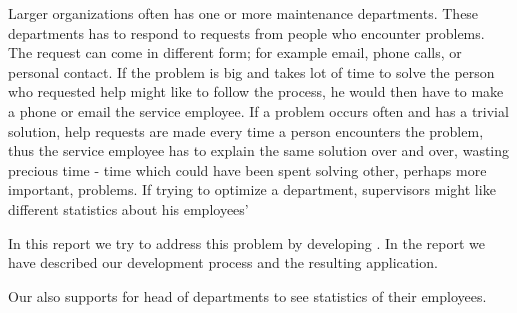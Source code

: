 Larger organizations often has one or more maintenance departments.
These departments has to respond to requests from people who encounter problems. 
The request can come in different form; for example email, phone calls, or personal contact. 
If the problem is big and takes lot of time to solve the person who requested help might like to follow the process, he would then have to make a phone or email the service employee. 
If a problem occurs often and has a trivial solution, help requests are made every time a person encounters the problem, thus the service employee has to explain the same solution over and over, wasting precious time - time which could have been spent solving other, perhaps more important, problems. If trying to optimize a department, supervisors might like different statistics about his employees' 

In this report we try to address this problem by developing \hdesk. In the report we have described our development process and the resulting \hdesk application.
	
Our \hdesk[] also supports for head of departments to see statistics of their employees.